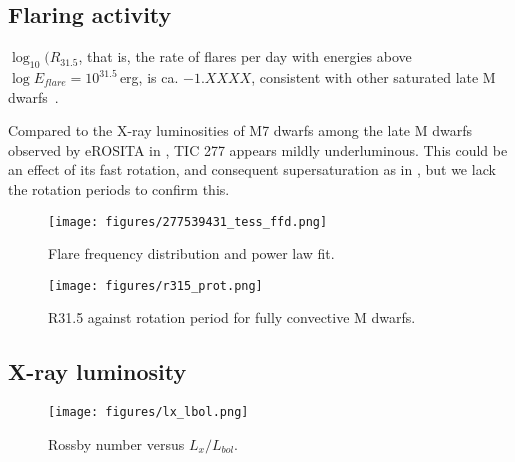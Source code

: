 \documentclass[twocolumn]{aastex631}
\begin{document}
\subsection{Flaring activity}
\label{sec:discussion:flares}

$\log_10(R_{31.5}$, that is, the rate of flares per day with energies above $\log E_{flare}=10^{31.5}\,$erg, is ca. $-1.XXXX$, consistent with other saturated late M dwarfs~\citep{medina2022galactic}.

Compared to the X-ray luminosities of M7 dwarfs among the late M dwarfs observed by eROSITA in \citet{stelzer2022first}, TIC 277 appears mildly underluminous. This could be an effect of its fast rotation, and consequent supersaturation as in \citet{magaudda2022first}, but we lack the rotation periods to confirm this. 

\begin{figure}
    \begin{centering}
        \texttt{[image: figures/277539431\_tess\_ffd.png]}
        \caption{
         Flare frequency distribution and power law fit.
        }
        \label{fig:ffd}
    \end{centering}
\end{figure}


\begin{figure}
    \begin{centering}
        \texttt{[image: figures/r315\_prot.png]}
        \caption{
         R31.5 against rotation period for fully convective M dwarfs.
        }
        \label{fig:r315}
    \end{centering}
\end{figure}


\subsection{X-ray luminosity}
\label{sec:discussion:xraylum}

\begin{figure}[ht!]
    \begin{centering}
        \texttt{[image: figures/lx\_lbol.png]}
        \caption{
         Rossby number versus $L_x/L_{bol}$.
        }
        \label{fig:lxlbol}
    \end{centering}
\end{figure}
\end{document}

